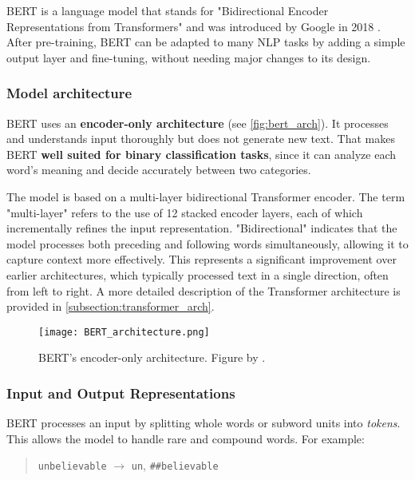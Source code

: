     \noindent BERT is a language model that stands for "Bidirectional Encoder Representations from Transformers" and was introduced by Google in 2018 \citep{devlinBERTPretrainingDeep2019}. After pre-training, BERT can be adapted to many NLP tasks by adding a simple output layer and fine-tuning, without needing major changes to its design.

\subsubsection{Model architecture}
    BERT uses an \textbf{encoder-only architecture} (see \autoref{fig:bert_arch}). It processes and understands input thoroughly but does not generate new text. That makes BERT \textbf{well suited for binary classification tasks}, since it can analyze each word’s meaning and decide accurately between two categories.

    The model is based on a multi-layer bidirectional Transformer encoder. The term "multi-layer" refers to the use of 12 stacked encoder layers, each of which incrementally refines the input representation. "Bidirectional" indicates that the model processes both preceding and following words simultaneously, allowing it to capture context more effectively. This represents a significant improvement over earlier architectures, which typically processed text in a single direction, often from left to right. A more detailed description of the Transformer architecture is provided in \autoref{subsection:transformer_arch}.

\begin{figure}
    \centering
	\texttt{[image: BERT\_architecture.png]}	
    \caption{BERT's encoder-only architecture. Figure by \citet{smithCompleteGuideBERT2024}.}
    \label{fig:bert_arch}
\end{figure}

\subsubsection{Input and Output Representations} \label{subsection:input_output}
BERT processes an input by splitting whole words or subword units into \textit{tokens}. This allows the model to handle rare and compound words. For example:

\begin{quote}
    \texttt{unbelievable} $\rightarrow$ \texttt{un}, \texttt{\#\#believable}
\end{quote}

